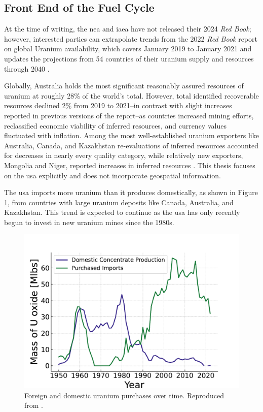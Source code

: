 \subsection{Front End of the Fuel Cycle}
\label{sec:front_end}
At the time of writing, the \gls{nea} and \gls{iaea} have not released their  2024 \textit{Red Book}; however, interested parties can extrapolate trends from the 2022 \textit{Red Book} report on global Uranium availability, which covers January 2019 to January 2021 and updates the projections from 54 countries of their uranium supply and resources through 2040 \cite{nea_red_book_2022}.

Globally, Australia holds the most significant reasonably assured resources
of uranium at roughly 28\% of the world's total. However, total identified recoverable resources declined 2\% from 2019 to 2021--in contrast with slight increases reported in previous versions of the report--as countries increased mining efforts, reclassified economic viability of inferred resources, and currency values fluctuated with inflation. Among the most well-established uranium exporters like Australia, Canada, and Kazakhstan re-evaluations of inferred resources accounted for decreases in nearly every quality category, while relatively new exporters, Mongolia and Niger, reported increases in inferred resources \cite{nea_red_book_2022}. This thesis focuses on the \gls{usa} explicitly and does not incorporate geospatial information.

The \gls{usa} imports more uranium than it produces domestically, as shown in Figure \ref{fig:foregin_u3o8}, from countries with large uranium deposits like Canada, Australia, and Kazakhstan. This trend is expected to continue as the \gls{usa} has only recently begun to invest in new uranium mines since the 1980s.

\begin{figure}[H]
   \centering
   \includegraphics[scale=0.7]{images/intro/uranium_production_imports.pdf}
   \caption{Foreign and domestic uranium purchases over time. Reproduced from \cite{eia_monthly_energy_review_2024}.}
   \label{fig:foregin_u3o8}
\end{figure}

